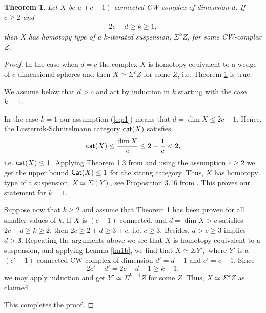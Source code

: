 \documentclass[10pt,a4paper]{amsart}
\newtheorem{teo}[lema]{Theorem}
\newcommand{\cat}{{\sf{cat}}}
\newcommand{\Cat}{{\sf{Cat}}}
\begin{document}
\begin{teo}\label{thmb}
Let $X$ be a $(c-1)$-connected CW-complex of dimension $d$. If $c\ge 2$ and 
\begin{eqnarray}\label{eq:1}
2c-d\ge k\ge 1,
\end{eqnarray} 
then $X$ has homotopy type of a $k$-iterated suspension,
$\Sigma^k Z$, for some CW-complex $Z$. 
\end{teo}
\begin{proof}  In the case when $d=c$ the complex $X$ is homotopy equivalent to a wedge of $c$-dimensional spheres and then $X\simeq \Sigma^c Z$ for some $Z$, i.e. Theorem \ref{thmb} is true.  

We assume below that $d>c$ and act by induction in $k$ starting with the case $k=1$. 

In the case $k=1$ our assumption (\ref{eq:1}) means that $d=\dim X \le 2c-1$. 
Hence, the Lusternik-Schnirelmann category $\cat(X)$ satisfies 
$$
\cat(X)\le \frac{\dim X}{c} \le 2-\frac{1}{c}<2,
$$
i.e. $\cat(X)\le 1$. Applying Theorem 1.3 from \cite{Ganea} and using the assumption $c\ge 2$ we get the upper bound $\Cat(X)\le 1$ for the strong category. 
Thus, $X$ has homotopy type of a suspension, $X\simeq \Sigma (Y)$, see Proposition 3.16 from \cite{CLOT}. 
This proves our statement for $k=1$. 

Suppose now that $k\ge 2$ and assume that Theorem \ref{thmb} has been proven for all smaller values of $k$. If $X$ is $(c-1)$-connected, and $d=\dim X > c$ satisfies
$2c-d\ge k\ge 2$, then $2c \ge 2+d\ge 3+c$, i.e. $c\ge 3$. Besides, $d>c\ge 3$ implies $d>3$. 
Repeating the arguments above we see that $X$ is homotopy equivalent to a suspension, and 
applying Lemma \ref{lm1b}, we find that $X\simeq \Sigma Y',$ where $Y'$ is a $(c'-1)$-connected CW-complex of dimension $d'=d-1$ and $c'=c-1$. 
Since 
$$
2c'-d'=2c-d-1\ge k-1,
$$
we may apply induction and get $Y'\simeq \Sigma^{k-1}Z$ for some $Z$. Thus, $X\simeq \Sigma^kZ$ as claimed. 

This completes the proof. 
\end{proof}


%
%
%
%
\end{document}
